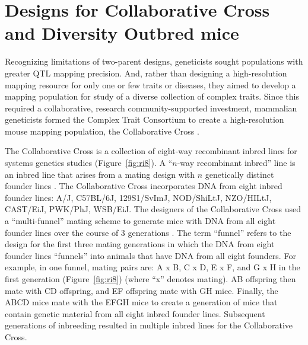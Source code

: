 \documentclass[oneside]{book}\usepackage[]{graphicx}\usepackage[]{color}
\begin{document}
\section{Designs for Collaborative Cross and Diversity Outbred mice}\label{sec:multiparent-designs}

Recognizing limitations of two-parent designs, geneticists sought populations with 
greater QTL mapping precision. And, rather than designing a high-resolution mapping 
resource for only one or few traits or diseases, they aimed to develop a mapping population for 
study of a diverse collection of complex traits. Since this required a collaborative, 
research community-supported
investment, mammalian geneticists formed the Complex Trait Consortium to 
create a high-resolution mouse mapping population, the Collaborative 
Cross
\citep{de2014genetics,threadgill2002genetic,churchill2004collaborative,threadgill2012ten}.

The Collaborative Cross is a collection of eight-way recombinant inbred lines for 
systems genetics studies (Figure~\ref{fig:ri8}). A ``$n$-way recombinant inbred'' line is an inbred line that arises 
from a mating design with $n$ genetically distinct founder lines \citep{bailey1971recombinant,crow2007haldane}. The Collaborative 
Cross incorporates DNA from eight inbred founder lines: A/J, C57BL/6J, 129S1/SvImJ, 
NOD/ShiLtJ, NZO/HILtJ, CAST/EiJ, PWK/PhJ, WSB/EiJ. The designers of the Collaborative Cross used a ``multi-funnel'' mating scheme to 
generate
mice with DNA from all eight founder lines over the course of 3 generations
\citep{churchill2004collaborative}.
The term ``funnel'' refers to the design for the first three mating generations in which the
DNA from eight founder lines ``funnels'' into animals that have DNA from all eight founders.
For example, in one funnel, mating pairs are: A x B, C x D, E x F, and G x H
in the first generation (Figure~\ref{fig:ri8}) (where ``x'' denotes mating).
AB offspring then mate with CD offspring, and EF offspring mate with GH mice.
Finally, the ABCD mice mate with the EFGH mice to create a generation of mice that
contain genetic material from all eight inbred founder lines.
Subsequent generations of inbreeding resulted in multiple inbred lines for the Collaborative Cross.





\end{document}
